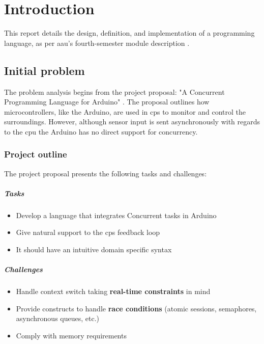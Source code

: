 \chapter{Introduction}\label{cha:introduction}
This report details the design, definition, and implementation of a programming language, as per \gls{aau}'s fourth-semester module description \cite{AAU_Modules_P4}.

\section{Initial problem}\label{sec:initialproblem}
The problem analysis begins from the project proposal: "A Concurrent Programming Language for Arduino" \cite{Project_Proposals_2022}. The proposal outlines how microcontrollers, like the Arduino, are used in \gls{cps} to monitor and control the surroundings. However, although sensor input is sent asynchronously with regards to the \gls{cpu} the Arduino has no direct support for concurrency.

\subsection{Project outline}
The project proposal presents the following tasks and challenges:

\paragraph{Tasks}
\begin{itemize}
    \item Develop a language that integrates Concurrent tasks in Arduino
    \item Give natural support to the \gls{cps} feedback loop
    \item It should have an intuitive domain specific syntax
\end{itemize}

\paragraph{Challenges}
\begin{itemize}
    \item Handle context switch taking \textbf{real-time constraints} in mind
    \item Provide constructs to handle \textbf{race conditions} (atomic sessions, semaphores, asynchronous queues, etc.)
    \item Comply with memory requirements
\end{itemize}

